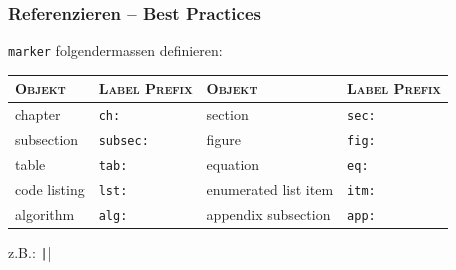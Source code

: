 \documentclass{beamer}                %
\newcommand*\code[1]{\texttt{#1}}
\begin{document}
\begin{frame}[fragile] %
    \frametitle{Referenzieren -- Best Practices}

    \centering

    \code{marker} folgendermassen definieren:

    \vspace*{1em}

    \begin{tabular}{ll|p{30mm}l}
        \toprule
        \scshape Objekt & \scshape Label Prefix & \scshape Objekt      & \scshape Label Prefix \\
        \midrule
        chapter         & \code{ch:}            & section              & \code{sec:}           \\
        subsection      & \code{subsec:}        & figure               & \code{fig:}           \\
        table           & \code{tab:}           & equation             & \code{eq:}            \\
        code listing    & \code{lst:}           & enumerated list item & \code{itm:}           \\
        algorithm       & \code{alg:}           & appendix subsection  & \code{app:}           \\
        \bottomrule
    \end{tabular}

    \begin{center}
        z.B.: \texttt|\label{fig:la-tete-de-robespierre}|
    \end{center}
\end{frame}
\end{document}
